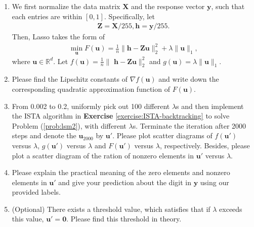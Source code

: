 \documentclass[11pt,letter,notitlepage]{article}
\begin{document}
    
    \begin{enumerate}
        \item We first normalize the data matrix $\mathbf{X}$ and the response vector $\mathbf{y}$, such that each entries are within $[0,1]$. Specifically, let 
        \begin{align*}
            \mathbf{Z}= \mathbf{X}/255,\mathbf{h}=\mathbf{y}/255.
        \end{align*}
        Then, Lasso takes the form of
        \begin{align}\label{prob:lsm2}
          \min_{\textbf{u}}F(\textbf{u}) = \frac{1}{n}\|\textbf{h}-\textbf{Z}\textbf{u}\|_2^2+\lambda\|\textbf{u}\|_1,
        \end{align}
        where $\textbf{u}\in\mathbb{R}^{d}$. Let $f(\textbf{u})=\frac{1}{n}\|\textbf{ h}-\textbf{Z}\textbf{u}\|_2^2$ and $g(\textbf{u})=\lambda\|\textbf{u}\|_1$.
        \item
        Please find the Lipschitz constants of  $\nabla f(\textbf{u})$ and write down the corresponding quadratic approximation function of $F(\textbf{u})$.
        \item From 0.002 to 0.2, uniformly pick out 100 different $\lambda$s and then implement the ISTA algorithm in \textbf{Exercise} \ref{exercise:ISTA-backtracking} to solve Problem (\ref{prob:lsm2}), with different $\lambda$s. Terminate the iteration after 2000 steps and denote the $\textbf{u}_{2000}$ by $\textbf{u}'$. Please plot scatter diagrams of $f(\textbf{u}')$ versus $\lambda$, $g(\textbf{u}')$ versus $\lambda$ and $F(\textbf{u}')$ versus $\lambda$, respectively. Besides, please plot a scatter diagram of the ration of nonzero elements in $\textbf{u}'$ versus $\lambda$.
    
        \item Please explain the practical meaning of the zero elements and nonzero elements in $\textbf{u}'$ and give your prediction about the digit in $\textbf{y}$ using our provided labels.
        \item (Optional) There exists a threshold value, which satisfies  that if $\lambda$ exceeds this value, $\textbf{u}'=\textbf{0}$. Please find this threshold in theory.
    \end{enumerate}

\begin{solution}

\end{solution}

\newpage



\end{document}
